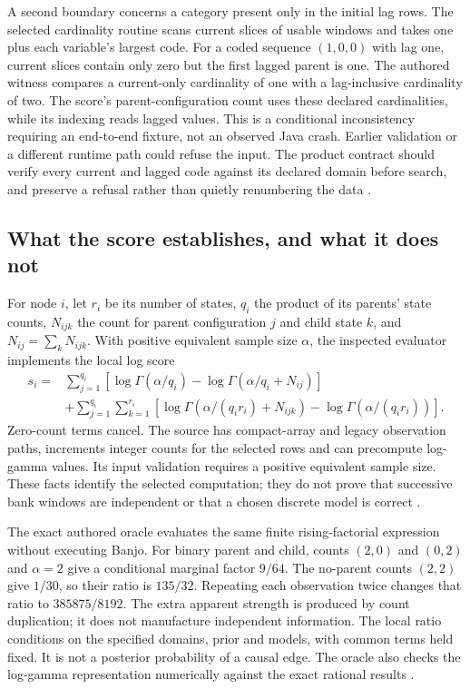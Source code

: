 A second boundary concerns a category present only in the initial lag rows.
The selected cardinality routine scans current slices of usable windows and
takes one plus each variable's largest code. For a coded sequence $(1,0,0)$
with lag one, current slices contain only zero but the first lagged parent is
one. The authored witness compares a current-only cardinality of one with a
lag-inclusive cardinality of two. The score's parent-configuration count uses
these declared cardinalities, while its indexing reads lagged values. This
is a conditional inconsistency requiring an end-to-end fixture, not an
observed Java crash. Earlier validation or a different runtime path could
refuse the input. The product contract should verify every current and lagged
code against its declared domain before search, and preserve a refusal rather
than quietly renumbering the data \cite{exec24_banjo_source,exec24_banjo_choice}.

\subsection{What the score establishes, and what it does not}
For node $i$, let $r_i$ be its number of states, $q_i$ the product of its
parents' state counts, $N_{ijk}$ the count for parent configuration $j$ and
child state $k$, and $N_{ij}=\sum_kN_{ijk}$. With positive equivalent sample
size $\alpha$, the inspected evaluator implements the local log score
\begin{align*}
 s_i={}&\sum_{j=1}^{q_i}\left[\log\Gamma(\alpha/q_i)
                  -\log\Gamma(\alpha/q_i+N_{ij})\right]\\
 &+\sum_{j=1}^{q_i}\sum_{k=1}^{r_i}
       \left[\log\Gamma(\alpha/(q_ir_i)+N_{ijk})
                  -\log\Gamma(\alpha/(q_ir_i))\right].
\end{align*}
Zero-count terms cancel. The source has compact-array and legacy observation
paths, increments integer counts for the selected rows and can precompute
log-gamma values. Its input validation requires a positive equivalent sample
size. These facts identify the selected computation; they do not prove that
successive bank windows are independent or that a chosen discrete model is
correct \cite{exec24_banjo_source}.

The exact authored oracle evaluates the same finite rising-factorial
expression without executing Banjo. For binary parent and child, counts
$(2,0)$ and $(0,2)$ and $\alpha=2$ give a conditional marginal factor $9/64$.
The no-parent counts $(2,2)$ give $1/30$, so their ratio is $135/32$.
Repeating each observation twice changes that ratio to $385875/8192$.
The extra apparent strength is produced by count duplication; it does not
manufacture independent information. The local ratio conditions on the
specified domains, prior and models, with common terms held fixed. It is
not a posterior probability of a causal edge. The oracle also checks the
log-gamma representation numerically against the exact rational results
\cite{exec24_banjo_choice}.

